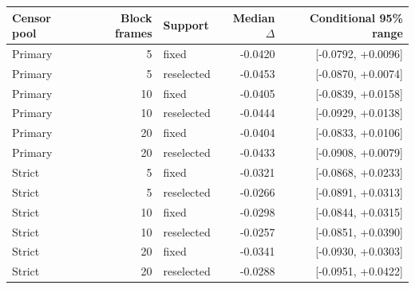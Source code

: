 \begin{tabular}{lrlrr}
\toprule
Censor pool & Block frames & Support & Median $\Delta$ & Conditional 95\% range \\
\midrule
Primary & 5 & fixed & -0.0420 & [-0.0792, +0.0096] \\
Primary & 5 & reselected & -0.0453 & [-0.0870, +0.0074] \\
Primary & 10 & fixed & -0.0405 & [-0.0839, +0.0158] \\
Primary & 10 & reselected & -0.0444 & [-0.0929, +0.0138] \\
Primary & 20 & fixed & -0.0404 & [-0.0833, +0.0106] \\
Primary & 20 & reselected & -0.0433 & [-0.0908, +0.0079] \\
Strict & 5 & fixed & -0.0321 & [-0.0868, +0.0233] \\
Strict & 5 & reselected & -0.0266 & [-0.0891, +0.0313] \\
Strict & 10 & fixed & -0.0298 & [-0.0844, +0.0315] \\
Strict & 10 & reselected & -0.0257 & [-0.0851, +0.0390] \\
Strict & 20 & fixed & -0.0341 & [-0.0930, +0.0303] \\
Strict & 20 & reselected & -0.0288 & [-0.0951, +0.0422] \\
\bottomrule
\end{tabular}

